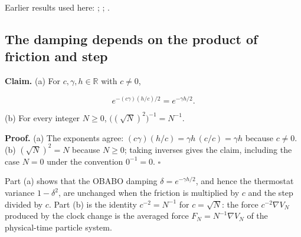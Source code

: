 \documentclass[11pt,a4paper]{report}
\begin{document}
Earlier results used here: \cite[Section~3.10.1]{LangevinLean2026Kinetic}; \cite[Section~3.10.3]{LangevinLean2026Kinetic}; \cite[Section~3.12.2]{LangevinLean2026Kinetic}.
\subsection{\texorpdfstring{The damping depends on the product of friction and step}{The damping depends on the product of friction and step}}
\label{report-step-KIPLMC-Rescaling-lean-3}


\textbf{Claim.} (a) For \(c,\gamma,h\in\mathbb R\) with \(c\ne0\),


\[e^{-(c\gamma)(h/c)/2}=e^{-\gamma h/2}.\]


(b) For every integer \(N\ge0\), \(\bigl((\sqrt N)^2\bigr)^{-1}=N^{-1}\).




\textbf{Proof.} (a) The exponents agree: \((c\gamma)(h/c)=\gamma h\,(c/c)=\gamma h\) because \(c\ne0\). (b) \((\sqrt N)^2=N\) because \(N\ge0\); taking inverses gives the claim, including the case \(N=0\) under the convention \(0^{-1}=0\). \(\square\)




Part (a) shows that the OBABO damping \(\delta=e^{-\gamma h/2}\), and hence the thermostat variance \(1-\delta^2\), are unchanged when the friction is multiplied by \(c\) and the step divided by \(c\). Part (b) is the identity \(c^{-2}=N^{-1}\) for \(c=\sqrt N\): the force \(c^{-2}\nabla V_N\) produced by the clock change is the averaged force \(F_N=N^{-1}\nabla V_N\) of the physical-time particle system.
\end{document}
